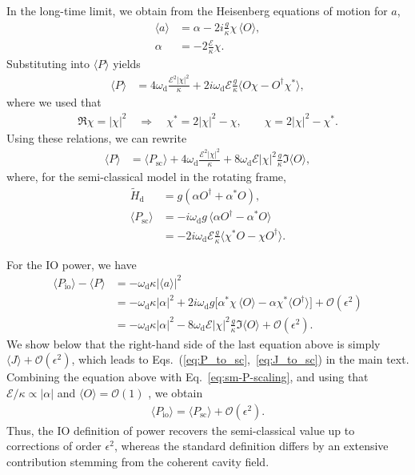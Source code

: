 \documentclass[aps,twocolumn,10pt,prl,floatfix,nofootinbib, superscriptaddress]{revtex4-2}
\begin{document}
In the long-time limit, we obtain from the Heisenberg equations of motion for $a$,
\begin{align}
    \langle a \rangle &= \alpha -2 i \frac{g}{\kappa} \chi\, \langle O\rangle ,\\
    \alpha &= -2\frac{\mathcal{E}}{\kappa}\chi.
\end{align}
Substituting into $\langle P \rangle$ yields
\begin{align}
    \langle P \rangle
    &= 4\omega_\text{d} \frac{\mathcal{E}^2|\chi|^2}{\kappa}
    + 2i\omega_\text{d} \mathcal{E}\frac{g}{\kappa}\langle O \chi - O^\dagger \chi^* \rangle,
\end{align}
where we used that
\begin{align}
    \Re \chi = |\chi|^2
    \quad\Rightarrow\quad
    \chi^* = 2|\chi|^2 - \chi,\qquad
    \chi = 2|\chi|^2 - \chi^*.
\end{align}
Using these relations, we can rewrite
\begin{align}
\langle P \rangle &=  \langle P_\text{sc} \rangle + 4\omega_\text{d} \frac{\mathcal{E}^2|\chi|^2}{\kappa}  + 8 \omega_\text{d} \mathcal{E}|\chi|^2\frac{g}{\kappa}\Im \langle O\rangle,
\label{eq:sm-P-scaling}
\end{align}
where, for the semi-classical model in the rotating frame,
\begin{align}
    \tilde{H}_\text{d}&= g ( \alpha O^\dagger + \alpha^* O),\\
    \langle P_\text{sc} \rangle  &= -i \omega_\text{d} g  \,\langle\alpha O^\dagger - \alpha^*O\rangle\\
            &=-2i\omega_\text{d}\mathcal{E}\frac{g}{\kappa} \langle \chi^*O - \chi O^\dagger \rangle.\nonumber
\end{align}

For the IO power, we have
\begin{align}
    \langle P_\text{io} \rangle - \langle P \rangle
    &=  -\omega_\text{d}\kappa\big|\langle a \rangle\big|^2 \\
    &= -\omega_\text{d}\kappa |\alpha|^2
    + 2i \omega_\text{d} g \big[\alpha^* \chi\,\langle O\rangle - \alpha \chi^* \langle O^\dagger\rangle\big]
    + \mathcal{O}\!\left(\epsilon^2\right) \nonumber\\
     &= -\omega_\text{d}\kappa |\alpha|^2
     - 8 \omega_\text{d} \mathcal{E}|\chi|^2\frac{g}{\kappa}\Im\langle O \rangle
    + \mathcal{O}\!\left(\epsilon^2\right). \nonumber
\end{align}
We show below that the right-hand side of the last equation above is simply $\langle J \rangle + \mathcal{O}(\epsilon^2)$, which leads to Eqs.~(\ref{eq:P_to_sc},~\ref{eq:J_to_sc}) in the main text.
Combining the equation above with Eq.~\eqref{eq:sm-P-scaling}, and using that $\mathcal{E}/\kappa \propto |\alpha|$ and $\langle O \rangle = \mathcal{O}(1)$
, we obtain
\begin{align}
\langle P_\text{io}\rangle = \langle P_\text{sc}\rangle + \mathcal{O}(\epsilon^2).
\label{eq:sm-Pio-scaling}
\end{align}
Thus, the IO definition of power recovers the semi-classical value up to corrections of order $\epsilon^2$, whereas the standard definition differs by an extensive contribution stemming from the coherent cavity field.
\end{document}
